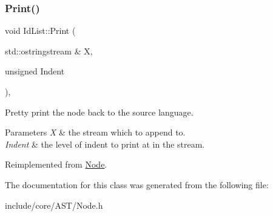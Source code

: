 \mbox{\label{class_id_list_a1e2cd3692c956de8cebb88ffcaf0242f}} 
\subsubsection{\texorpdfstring{Print()}{Print()}}
{\footnotesize\ttfamily void Id\+List\+::\+Print (\begin{DoxyParamCaption}\item[{std\+::ostringstream \&}]{X,  }\item[{unsigned}]{Indent }\end{DoxyParamCaption})\hspace{0.3cm}{\ttfamily [override]}, {\ttfamily [virtual]}}

Pretty print the node back to the source language. 
\begin{DoxyParams}{Parameters}
{\em X} & the stream which to append to. \\
\hline
{\em Indent} & the level of indent to print at in the stream. \\
\hline
\end{DoxyParams}


Reimplemented from \mbox{\hyperlink{class_node_a5325b760a6e6fe94227c0cff53af2c45}{Node}}.



The documentation for this class was generated from the following file\+:\begin{DoxyCompactItemize}
\item 
include/core/\+A\+S\+T/Node.\+h\end{DoxyCompactItemize}
